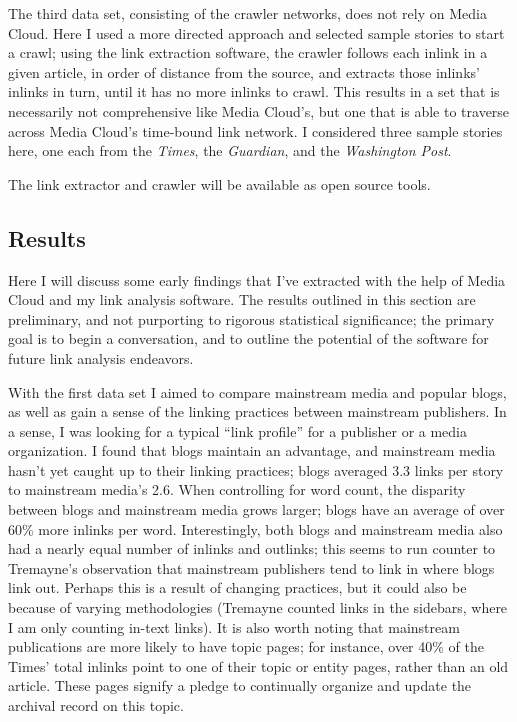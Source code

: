 The third data set, consisting of the crawler networks, does not rely on Media Cloud. Here I used a more directed approach and selected sample stories to start a crawl; using the link extraction software, the crawler follows each inlink in a given article, in order of distance from the source, and extracts those inlinks' inlinks in turn, until it has no more inlinks to crawl. This results in a set that is necessarily not comprehensive like Media Cloud's, but one that is able to traverse across Media Cloud's time-bound link network. I considered three sample stories here, one each from the \emph{Times}, the \emph{Guardian}, and the \emph{Washington Post}.

The link extractor and crawler will be available as open source tools.

\subsection{Results}

Here I will discuss some early findings that I've extracted with the help of Media Cloud and my link analysis software. The results outlined in this section are preliminary, and not purporting to rigorous statistical significance; the primary goal is to begin a conversation, and to outline the potential of the software for future link analysis endeavors.

With the first data set I aimed to compare mainstream media and popular blogs, as well as gain a sense of the linking practices between mainstream publishers. In a sense, I was looking for a typical ``link profile'' for a publisher or a media organization. I found that blogs maintain an advantage, and mainstream media hasn't yet caught up to their linking practices; blogs averaged 3.3 links per story to mainstream media's 2.6. When controlling for word count, the disparity between blogs and mainstream media grows larger; blogs have an average of over 60\% more inlinks per word. Interestingly, both blogs and mainstream media also had a nearly equal number of inlinks and outlinks; this seems to run counter to Tremayne's observation that mainstream publishers tend to link in where blogs link out. Perhaps this is a result of changing practices, but it could also be because of varying methodologies (Tremayne counted links in the sidebars, where I am only counting in-text links). It is also worth noting that mainstream publications are more likely to have topic pages; for instance, over 40\% of the Times' total inlinks point to one of their topic or entity pages, rather than an old article. These pages signify a pledge to continually organize and update the archival record on this topic.

